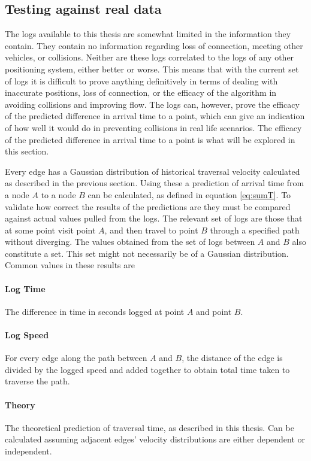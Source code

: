 \documentclass{article}
\begin{document}
		\subsection{Testing against real data}
			The logs available to this thesis are somewhat limited in the information they contain. They contain no information regarding loss of connection, meeting other vehicles, or collisions. Neither are these logs correlated to the logs of any other positioning system, either better or worse. This means that with the current set of logs it is difficult to prove anything definitively in terms of dealing with inaccurate positions, loss of connection, or the efficacy of the algorithm in avoiding collisions and improving flow. The logs can, however, prove the efficacy of the predicted difference in arrival time to a point, which can give an indication of how well it would do in preventing collisions in real life scenarios. The efficacy of the predicted difference in arrival time to a point is what will be explored in this section.

			Every edge has a Gaussian distribution of historical traversal velocity calculated as described in the previous section. Using these a prediction of arrival time from a node $A$ to a node $B$ can be calculated, as defined in equation \ref{eq:sumT}. To validate how correct the results of the predictions are they must be compared against actual values pulled from the logs. The relevant set of logs are those that at some point visit point $A$, and then travel to point $B$ through a specified path without diverging. The values obtained from the set of logs between $A$ and $B$ also constitute a set. This set might not necessarily be of a Gaussian distribution. Common values in these results are

			\paragraph{Log Time}
				The difference in time in seconds logged at point $A$ and point $B$.
			\paragraph{Log Speed}
				For every edge along the path between $A$ and $B$, the distance of the edge is divided by the logged speed and added together to obtain total time taken to traverse the path.
			\paragraph{Theory}
				The theoretical prediction of traversal time, as described in this thesis. Can be calculated assuming adjacent edges' velocity distributions are either dependent or independent.
\end{document}
